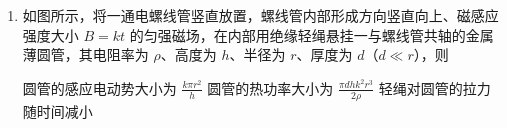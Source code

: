 \documentclass[\gkver]{gaokaozhenti}
\begin{document}
\begin{enumerate}
{	$W=m_{0}gH+\frac{1}{2}m_{0}v_{0}^{2}=300\UJ$

	故 AB 错误；

	C．水泵的输出能量转化为水的机械能，则

	$P_{\text{出}}=\frac{W}{t}=300\UW$

	而水泵的抽水效率（水泵的输出功率与输入功率之比）为 75\%，则

	$P_{\text{入}}=\frac{P_{\text{出}}}{75\%}=400\UW$

	故 C 错误；

	D．电动机的输出功率等于水泵所需要的输入功率，则电动机的机械功率为

	$P_{\text{机}}=P_{\text{入}}=400\UW$

	而电动机的电功率为

	$P_{\text{电}}=UI=440\UW$

	由能量守恒可知

	$P_{\text{电}}=I^{2}R+P_{\text{机}}$

	联立解得 $R=10\UO$。故 D 正确；

	故选 D。
}

\item
如图所示，将一通电螺线管竖直放置，螺线管内部形成方向竖直向上、磁感应强度大小 $B=kt$ 的匀强磁场，在内部用绝缘轻绳悬挂一与螺线管共轴的金属薄圆管，其电阻率为 $\rho$、高度为 $h$、半径为 $r$、厚度为 $d$（$d\ll r$），则 


{圆管的感应电动势大小为 $\frac{k\pi r^{2}}{h}$}
{圆管的热功率大小为 $\frac{\pi dhk^{2}r^{3}}{2\rho}$}
{轻绳对圆管的拉力随时间减小}

\end{enumerate}
\end{document}
